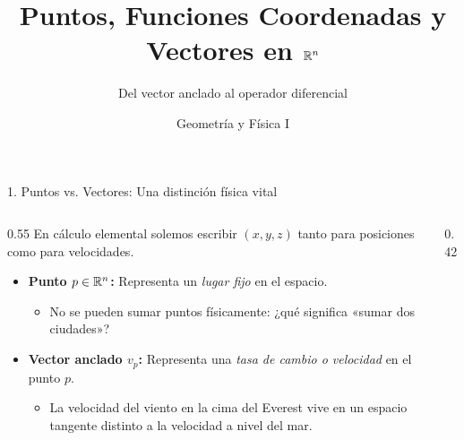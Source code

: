 \documentclass[10pt,aspectratio=169]{beamer}
\title[Semana 5: Vectores en el Espacio Euclidiano]{Puntos, Funciones Coordenadas y Vectores en $\mathbb{R}^n$}
\subtitle{Del vector anclado al operador diferencial}
\author{Geometría y Física I}
\institute{Licenciatura en Física}
\date{}
\begin{document}
\begin{frame}
  \titlepage
\end{frame}

\begin{frame}{1. Puntos vs. Vectores: Una distinción física vital}
  \begin{columns}[c]
    \begin{column}{0.55\textwidth}
      En cálculo elemental solemos escribir $(x, y, z)$ tanto para posiciones como para velocidades.
      \vspace{0.2cm}
      \begin{itemize}
        \item \textbf{Punto $p \in \mathbb{R}^n$:} Representa un \textit{lugar fijo} en el espacio.
        \begin{itemize}
          \item No se pueden sumar puntos físicamente: ¿qué significa «sumar dos ciudades»?
        \end{itemize}
        \vspace{0.15cm}
        \item \textbf{Vector anclado $v_p$:} Representa una \textit{tasa de cambio o velocidad} en el punto $p$.
        \begin{itemize}
          \item La velocidad del viento en la cima del Everest vive en un espacio tangente distinto a la velocidad a nivel del mar.
        \end{itemize}
      \end{itemize}
    \end{column}

    \begin{column}{0.42\textwidth}
      \centering
    \end{column}
  \end{columns}
\end{frame}
\end{document}
